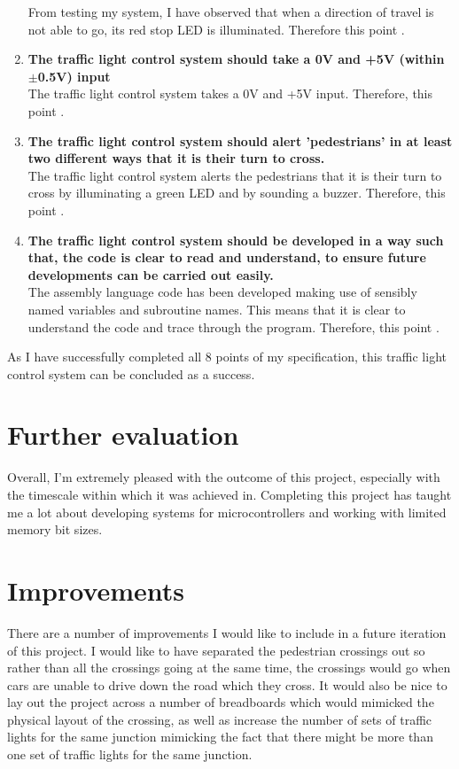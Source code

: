 \begin{enumerate}
    From testing my system, I have observed that when a direction of travel is not able to go, its red stop LED is illuminated. Therefore this point .
    \item \textbf{The traffic light control system should take a 0V and +5V (within $\pm$0.5V) input}\\
    The traffic light control system takes a 0V and +5V input. Therefore, this point .
    \item \textbf{The traffic light control system should alert 'pedestrians' in at least two different ways that it is their turn to cross.}\\
    The traffic light control system alerts the pedestrians that it is their turn to cross by illuminating a green LED and by sounding a buzzer. Therefore, this point .
    \item \textbf{The traffic light control system should be developed in a way such that, the code is clear to read and understand, to ensure future developments can be carried out easily.}\\
    The assembly language code has been developed making use of sensibly named variables and subroutine names. This means that it is clear to understand the code and trace through the program. Therefore, this point .
\end{enumerate}
As I have successfully completed all 8 points of my specification, this traffic light control system can be concluded as a success.

\section{Further evaluation}
Overall, I'm extremely pleased with the outcome of this project, especially with the timescale within which it was achieved in. Completing this project has taught me a lot about developing systems for microcontrollers and working with limited memory bit sizes. 

\section{Improvements}
There are a number of improvements I would like to include in a future iteration of this project. I would like to have separated the pedestrian crossings out so rather than all the crossings going at the same time, the crossings would go when cars are unable to drive down the road which they cross. It would also be nice to lay out the project across a number of breadboards which would mimicked the physical layout of the crossing, as well as increase the number of sets of traffic lights for the same junction mimicking the fact that there might be more than one set of traffic lights for the same junction. 